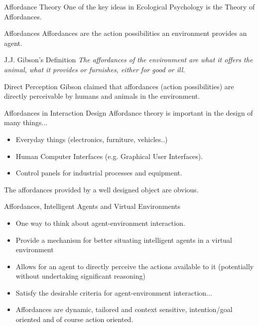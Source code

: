 \documentclass[xcolor=dvipsnames,t]{beamer}
\begin{document}
\begin{frame}{Affordance Theory} 
One of the key ideas in Ecological Psychology is the Theory of Affordances.
\begin{block}{Affordances} 
Affordances are the action possibilities an environment provides an agent.
\end{block} 
\pause
\begin{block}{J.J. Gibson's Definition} 
\emph{The affordances of the environment are what it offers the animal, what it
provides or furnishes, either for good or ill.} 
\end{block} 
\pause 
\begin{block}{Direct Perception} 
Gibson claimed that affordances (action possibilities) are directly perceivable
by humans and animals in the environment. 
\end{block} 
\end{frame} 

\begin{frame}{Affordances in Interaction Design} 
Affordance theory is important in the design of many things...
\begin{itemize}
    \item Everyday things (electronics, furniture, vehicles..)
    \item Human Computer Interfaces (e.g. Graphical User Interfaces). 
    \item Control panels for industrial processes and equipment.
\end{itemize} 
The affordances provided by a well designed object are obvious.
\end{frame} 

\begin{frame}{Affordances, Intelligent Agents and Virtual Environments} 
\begin{itemize} 
    \item One way to think about agent-environment interaction.
    \item Provide a mechanism for better situating intelligent agents in a
    virtual environment
    \item Allows for an agent to directly perceive the actions available to it
    (potentially without undertaking significant reasoning)
    \item Satisfy the desirable criteria for agent-environment interaction...
    \item Affordances are dynamic, tailored and context sensitive,
    intention/goal oriented and of course action oriented.
\end{itemize} 
\end{frame} 
\end{document}
